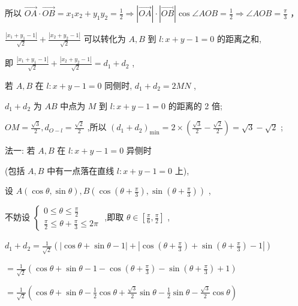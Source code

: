\documentclass[10pt]{article}
\begin{document}
所以 \(\overrightarrow{OA} \cdot  \overrightarrow{OB} = {x}_{1}{x}_{2} + {y}_{1}{y}_{2} = \frac{1}{2} \Rightarrow  \left| \overrightarrow{OA}\right|  \cdot  \left| \overrightarrow{OB}\right| \cos \angle {AOB} = \frac{1}{2} \Rightarrow  \angle {AOB} = \frac{\pi }{3}\) ，

\(\frac{\left| {x}_{1} + {y}_{1} - 1\right| }{\sqrt{2}} + \frac{\left| {x}_{2} + {y}_{2} - 1\right| }{\sqrt{2}}\) 可以转化为 \(A,B\) 到 \(l : x + y - 1 = 0\) 的距离之和,

即 \(\frac{\left| {x}_{1} + {y}_{1} - 1\right| }{\sqrt{2}} + \frac{\left| {x}_{2} + {y}_{2} - 1\right| }{\sqrt{2}} = {d}_{1} + {d}_{2}\) ,

若 \(A,B\) 在 \(l : x + y - 1 = 0\) 同侧时, \({d}_{1} + {d}_{2} = {2MN}\) ,

\({d}_{1} + {d}_{2}\) 为 \({AB}\) 中点为 \(M\) 到 \(l : x + y - 1 = 0\) 的距离的 2 倍;

\({OM} = \frac{\sqrt{3}}{2},{d}_{O - l} = \frac{\sqrt{2}}{2}\) ,所以 \({\left( {d}_{1} + {d}_{2}\right) }_{\min } = 2 \times  \left( {\frac{\sqrt{3}}{2} - \frac{\sqrt{2}}{2}}\right)  = \sqrt{3} - \sqrt{2}\) ;

法一: 若 \(A,B\) 在 \(l : x + y - 1 = 0\) 异侧时

(包括 \(A,B\) 中有一点落在直线 \(l : x + y - 1 = 0\) 上),

设 \(A\left( {\cos \theta ,\sin \theta }\right) ,B\left( {\cos \left( {\theta  + \frac{\pi }{3}}\right) ,\sin \left( {\theta  + \frac{\pi }{3}}\right) }\right)\) ,

不妨设 \(\left\{  \begin{array}{l} 0 \leq  \theta  \leq  \frac{\pi }{2} \\  \frac{\pi }{2} \leq  \theta  + \frac{\pi }{3} \leq  {2\pi } \end{array}\right.\) ,即取 \(\theta  \in  \left\lbrack  {\frac{\pi }{6},\frac{\pi }{2}}\right\rbrack\) ,

\({d}_{1} + {d}_{2} = \frac{1}{\sqrt{2}}\left( {\left| {\cos \theta  + \sin \theta  - 1}\right|  + \left| {\cos \left( {\theta  + \frac{\pi }{3}}\right)  + \sin \left( {\theta  + \frac{\pi }{3}}\right)  - 1}\right| }\right)\)

\(= \frac{1}{\sqrt{2}}\left( {\cos \theta  + \sin \theta  - 1 - \cos \left( {\theta  + \frac{\pi }{3}}\right)  - \sin \left( {\theta  + \frac{\pi }{3}}\right)  + 1}\right)\)

\(= \frac{1}{\sqrt{2}}\left( {\cos \theta  + \sin \theta  - \frac{1}{2}\cos \theta  + \frac{\sqrt{3}}{2}\sin \theta  - \frac{1}{2}\sin \theta  - \frac{\sqrt{3}}{2}\cos \theta }\right)\)
\end{document}
